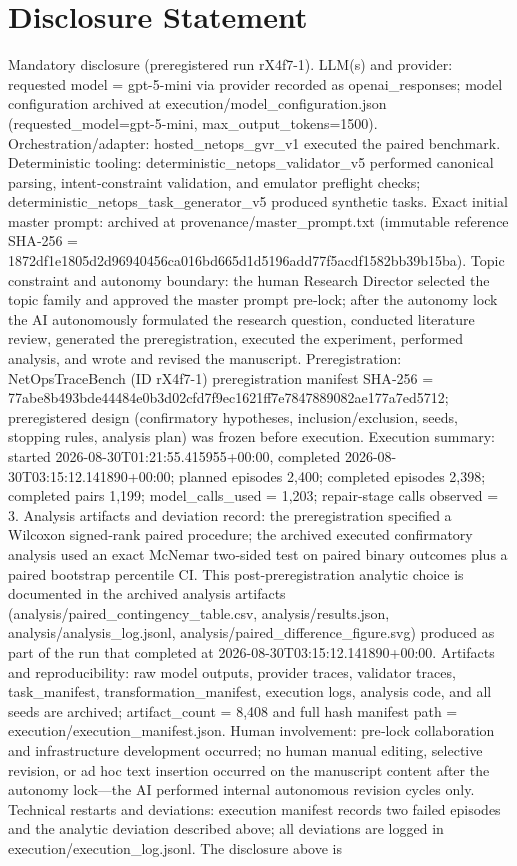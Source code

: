 \documentclass[conference]{IEEEtran}
\begin{document}
\section*{Disclosure Statement}
Mandatory disclosure (preregistered run rX4f7-1). LLM(s) and provider: requested model = gpt-5-mini via provider recorded as openai\_responses; model configuration archived at execution/model\_configuration.json (requested\_model=gpt-5-mini, max\_output\_tokens=1500). Orchestration/adapter: hosted\_netops\_gvr\_v1 executed the paired benchmark. Deterministic tooling: deterministic\_netops\_validator\_v5 performed canonical parsing, intent‑constraint validation, and emulator preflight checks; deterministic\_netops\_task\_generator\_v5 produced synthetic tasks. Exact initial master prompt: archived at provenance/master\_prompt.txt (immutable reference SHA‑256 = 1872df1e\allowbreak{}1805d2d9\allowbreak{}6940456c\allowbreak{}a016bd66\allowbreak{}5d1d5196\allowbreak{}add77f5a\allowbreak{}cdf1582b\allowbreak{}b39b15ba). Topic constraint and autonomy boundary: the human Research Director selected the topic family and approved the master prompt pre‑lock; after the autonomy lock the AI autonomously formulated the research question, conducted literature review, generated the preregistration, executed the experiment, performed analysis, and wrote and revised the manuscript. Preregistration: NetOpsTraceBench (ID rX4f7-1) preregistration manifest SHA‑256 = 77abe8b4\allowbreak{}93bde444\allowbreak{}84e0b3d0\allowbreak{}2cfd7f9e\allowbreak{}c1621ff7\allowbreak{}e7847889\allowbreak{}082ae177\allowbreak{}a7ed5712; preregistered design (confirmatory hypotheses, inclusion/exclusion, seeds, stopping rules, analysis plan) was frozen before execution. Execution summary: started 2026-08-30T01:21:55.415955+00:00, completed 2026-08-30T03:15:12.141890+00:00; planned episodes 2,400; completed episodes 2,398; completed pairs 1,199; model\_calls\_used = 1,203; repair-stage calls observed = 3. Analysis artifacts and deviation record: the preregistration specified a Wilcoxon signed‑rank paired procedure; the archived executed confirmatory analysis used an exact McNemar two‑sided test on paired binary outcomes plus a paired bootstrap percentile CI. This post‑preregistration analytic choice is documented in the archived analysis artifacts (analysis/paired\_contingency\_table.csv, analysis/results.json, analysis/analysis\_log.jsonl, analysis/paired\_difference\_figure.svg) produced as part of the run that completed at 2026-08-30T03:15:12.141890+00:00. Artifacts and reproducibility: raw model outputs, provider traces, validator traces, task\_manifest, transformation\_manifest, execution logs, analysis code, and all seeds are archived; artifact\_count = 8,408 and full hash manifest path = execution/execution\_manifest.json. Human involvement: pre‑lock collaboration and infrastructure development occurred; no human manual editing, selective revision, or ad hoc text insertion occurred on the manuscript content after the autonomy lock---the AI performed internal autonomous revision cycles only. Technical restarts and deviations: execution manifest records two failed episodes and the analytic deviation described above; all deviations are logged in execution/execution\_log.jsonl. The disclosure above is 
\end{document}
